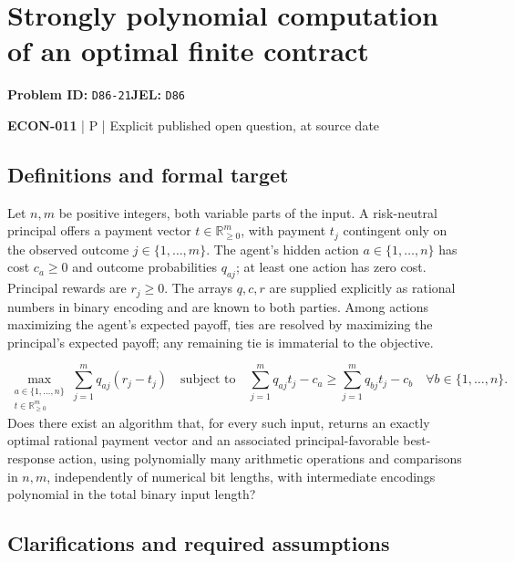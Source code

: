 \documentclass[11pt,a4paper]{article}
\newcommand{\R}{\mathbb R}
\begin{document}
\section*{Strongly polynomial computation of an optimal finite contract}
\textbf{Problem ID:} \texttt{D86-21}\quad \textbf{JEL:} \texttt{D86}\par
\label{problem:OP-0596}


\label{audited:ECON-011}

{\sffamily\small\color{muted}\textbf{ECON-011} | P | Explicit published open question, at source date\par}

\subsection*{Definitions and formal target}

Let $n,m$ be positive integers, both variable parts of the input. A risk-neutral principal offers a payment vector $t\in\R_{\geq0}^{m}$, with payment $t_j$ contingent only on the observed outcome $j\in\{1,\ldots,m\}$. The agent's hidden action $a\in\{1,\ldots,n\}$ has cost $c_a\geq0$ and outcome probabilities $q_{aj}$; at least one action has zero cost. Principal rewards are $r_j\geq0$. The arrays $q,c,r$ are supplied explicitly as rational numbers in binary encoding and are known to both parties. Among actions maximizing the agent's expected payoff, ties are resolved by maximizing the principal's expected payoff; any remaining tie is immaterial to the objective.

\[
 \max_{\substack{a\in\{1,\ldots,n\}\\t\in\R_{\geq0}^{m}}}\sum_{j=1}^{m}q_{aj}(r_j-t_j)
 \quad\text{subject to}\quad
 \sum_{j=1}^{m}q_{aj}t_j-c_a\geq\sum_{j=1}^{m}q_{bj}t_j-c_b
 \quad\forall b\in\{1,\ldots,n\}.
\]
Does there exist an algorithm that, for every such input, returns an exactly optimal rational payment vector and an associated principal-favorable best-response action, using polynomially many arithmetic operations and comparisons in $n,m$, independently of numerical bit lengths, with intermediate encodings polynomial in the total binary input length?

\subsection*{Clarifications and required assumptions}
\end{document}
